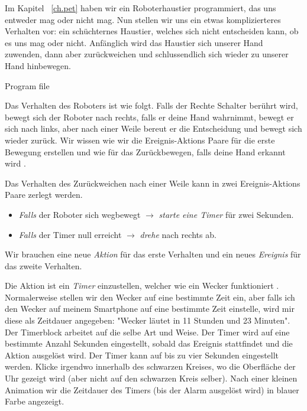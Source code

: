 
Im Kapitel ~\ref{ch.pet} haben wir ein Roboterhaustier programmiert,
das uns entweder mag oder nicht mag.
Nun stellen wir uns ein etwas komplizierteres  Verhalten vor:
ein schüchternes Haustier, welches sich nicht entscheiden kann,
ob es uns mag oder nicht. Anfänglich wird das Haustier sich unserer Hand zuwenden,
dann aber zurückweichen und schlussendlich sich wieder zu unserer Hand hinbewegen.

{\raggedleft \hfill Program file }

Das Verhalten des Roboters ist wie folgt. Falls der Rechte Schalter berührt wird, bewegt sich der Roboter nach rechts, falls er deine Hand wahrnimmt, bewegt er sich nach links, aber nach einer Weile bereut er die Entscheidung und bewegt sich wieder zurück. Wir wissen wie wir die Ereignis-Aktions Paare für die erste Bewegung erstellen  und wie für das Zurückbewegen, falls deine Hand erkannt wird .

Das Verhalten des Zurückweichen nach einer Weile kann in zwei Ereignis-Aktions Paare zerlegt werden.

\begin{itemize}

\item \emph{Falls} der Roboter sich wegbewegt $\rightarrow$
\emph{starte eine Timer} für zwei Sekunden.

\item \emph{Falls} der Timer null erreicht $\rightarrow$ \emph{drehe}
nach rechts ab.

\end{itemize}

Wir brauchen eine neue \emph{Aktion} für das erste Verhalten und ein neues \emph{Ereignis} für das zweite Verhalten.

Die Aktion ist ein \emph{Timer} einzustellen, welcher wie ein Wecker funktioniert .  Normalerweise stellen wir den Wecker auf eine bestimmte Zeit ein, aber falls ich den Wecker auf meinem Smartphone auf eine bestimmte Zeit einstelle, wird mir diese als Zeitdauer angegeben: "Wecker läutet in 11 Stunden und 23 Minuten". Der Timerblock arbeitet auf die selbe Art und Weise. Der Timer wird auf eine bestimmte Anzahl Sekunden eingestellt, sobald das Ereignis stattfindet und die Aktion ausgelöst wird. Der Timer kann auf bis zu vier Sekunden eingestellt werden. Klicke irgendwo innerhalb des schwarzen Kreises, wo die Oberfläche der Uhr gezeigt wird (aber nicht auf den schwarzen Kreis selber). Nach einer kleinen Animation wir die Zeitdauer des Timers (bis der Alarm ausgelöst wird) in blauer Farbe angezeigt.

